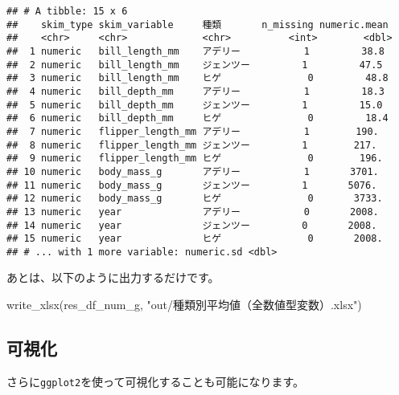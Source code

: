 \documentclass[
  xelatex,ja=standard, b5paper]{bxjsbook}
\newenvironment{Shaded}{\begin{snugshade}}{\end{snugshade}}
\newcommand{\FunctionTok}[1]{\textcolor[rgb]{0.00,0.00,0.00}{#1}}
\newcommand{\NormalTok}[1]{#1}
\newcommand{\StringTok}[1]{\textcolor[rgb]{0.31,0.60,0.02}{#1}}
\begin{document}
\begin{verbatim}
## # A tibble: 15 x 6
##    skim_type skim_variable     種類       n_missing numeric.mean
##    <chr>     <chr>             <chr>          <int>        <dbl>
##  1 numeric   bill_length_mm    アデリー           1         38.8
##  2 numeric   bill_length_mm    ジェンツー         1         47.5
##  3 numeric   bill_length_mm    ヒゲ               0         48.8
##  4 numeric   bill_depth_mm     アデリー           1         18.3
##  5 numeric   bill_depth_mm     ジェンツー         1         15.0
##  6 numeric   bill_depth_mm     ヒゲ               0         18.4
##  7 numeric   flipper_length_mm アデリー           1        190. 
##  8 numeric   flipper_length_mm ジェンツー         1        217. 
##  9 numeric   flipper_length_mm ヒゲ               0        196. 
## 10 numeric   body_mass_g       アデリー           1       3701. 
## 11 numeric   body_mass_g       ジェンツー         1       5076. 
## 12 numeric   body_mass_g       ヒゲ               0       3733. 
## 13 numeric   year              アデリー           0       2008. 
## 14 numeric   year              ジェンツー         0       2008. 
## 15 numeric   year              ヒゲ               0       2008. 
## # ... with 1 more variable: numeric.sd <dbl>
\end{verbatim}

あとは、以下のように出力するだけです。

\begin{Shaded}
\begin{Highlighting}[]
\FunctionTok{write\_xlsx}\NormalTok{(res\_df\_num\_g, }\StringTok{"out/種類別平均値（全数値型変数）.xlsx"}\NormalTok{)}
\end{Highlighting}
\end{Shaded}

\hypertarget{ux53efux8996ux5316}{%
\subsection{可視化}\label{ux53efux8996ux5316}}

さらに\texttt{ggplot2}を使って可視化することも可能になります。
\end{document}
